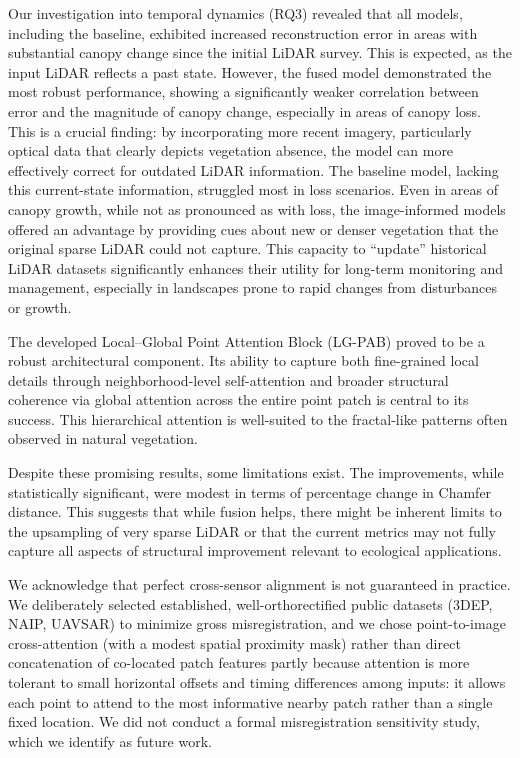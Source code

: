 \documentclass[remotesensing,article,accept,pdftex,moreauthors]{Definitions/mdpi}
\begin{document}
Our investigation into temporal dynamics (RQ3) revealed that all models, including the baseline, exhibited increased reconstruction error in areas with substantial canopy change since the initial LiDAR survey. This is expected, as the input LiDAR reflects a past state. However, the fused model demonstrated the most robust performance, showing a significantly weaker correlation between error and the magnitude of canopy change, especially in areas of canopy loss. This is a crucial finding: by incorporating more recent imagery, particularly optical data that clearly depicts vegetation absence, the model can more effectively correct for outdated LiDAR information. The baseline model, lacking this current-state information, struggled most in loss scenarios. Even in areas of canopy growth, while not as pronounced as with loss, the image-informed models offered an advantage by providing cues about new or denser vegetation that the original sparse LiDAR could not capture. This capacity to ``update'' historical LiDAR datasets significantly enhances their utility for long-term monitoring and management, especially in landscapes prone to rapid changes from disturbances or growth.

The developed Local--Global Point Attention Block (LG-PAB) proved to be a robust architectural component. Its ability to capture both fine-grained local details through neighborhood-level self-attention and broader structural coherence via global attention across the entire point patch is central to its success. This hierarchical attention is well-suited to the fractal-like patterns often observed in natural vegetation.

Despite these promising results, some limitations exist. The improvements, while statistically significant, were modest in terms of percentage change in Chamfer distance. This suggests that while fusion helps, there might be inherent limits to the upsampling of very sparse LiDAR or that the current metrics may not fully capture all aspects of structural improvement relevant to ecological applications.

We acknowledge that perfect cross-sensor alignment is not guaranteed in practice. We deliberately selected established, well-orthorectified public datasets (3DEP, NAIP, UAVSAR) to minimize gross misregistration, and we chose point-to-image cross-attention (with a modest spatial proximity mask) rather than direct concatenation of co-located patch features partly because attention is more tolerant to small horizontal offsets and timing differences among inputs: it allows each point to attend to the most informative nearby patch rather than a single fixed location. We did not conduct a formal misregistration sensitivity study, which we identify as future work.
\end{document}
